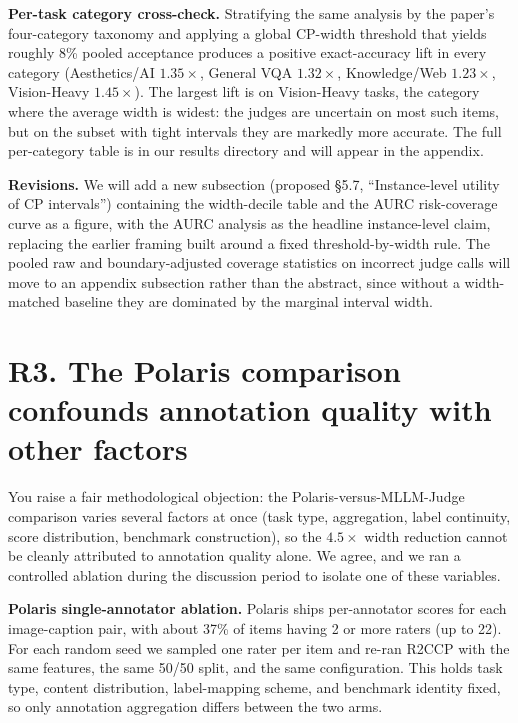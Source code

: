 \documentclass[11pt]{article}
\begin{document}
\textbf{Per-task category cross-check.} Stratifying the same analysis by the paper's four-category taxonomy and applying a global CP-width threshold that yields roughly 8\% pooled acceptance produces a positive exact-accuracy lift in every category (Aesthetics/AI $1.35\times$, General VQA $1.32\times$, Knowledge/Web $1.23\times$, Vision-Heavy $1.45\times$). The largest lift is on Vision-Heavy tasks, the category where the average width is widest: the judges are uncertain on most such items, but on the subset with tight intervals they are markedly more accurate. The full per-category table is in our results directory and will appear in the appendix.

\textbf{Revisions.} We will add a new subsection (proposed \S 5.7, ``Instance-level utility of CP intervals'') containing the width-decile table and the AURC risk-coverage curve as a figure, with the AURC analysis as the headline instance-level claim, replacing the earlier framing built around a fixed threshold-by-width rule. The pooled raw and boundary-adjusted coverage statistics on incorrect judge calls will move to an appendix subsection rather than the abstract, since without a width-matched baseline they are dominated by the marginal interval width.

\section*{R3. The Polaris comparison confounds annotation quality with other factors}

You raise a fair methodological objection: the Polaris-versus-MLLM-Judge comparison varies several factors at once (task type, aggregation, label continuity, score distribution, benchmark construction), so the $4.5\times$ width reduction cannot be cleanly attributed to annotation quality alone. We agree, and we ran a controlled ablation during the discussion period to isolate one of these variables.

\textbf{Polaris single-annotator ablation.} Polaris ships per-annotator scores for each image-caption pair, with about 37\% of items having 2 or more raters (up to 22). For each random seed we sampled one rater per item and re-ran R2CCP with the same features, the same 50/50 split, and the same configuration. This holds task type, content distribution, label-mapping scheme, and benchmark identity fixed, so only annotation aggregation differs between the two arms.
\end{document}
